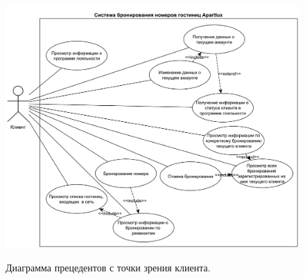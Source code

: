 \begin{figure}[h]
	\begin{center}
		{\includegraphics[scale = 0.56]{img/use-case/client.pdf}}
		\caption{Диаграмма прецедентов с точки зрения клиента.}
		\label{fig:use-case-client}
	\end{center}
\end{figure}

